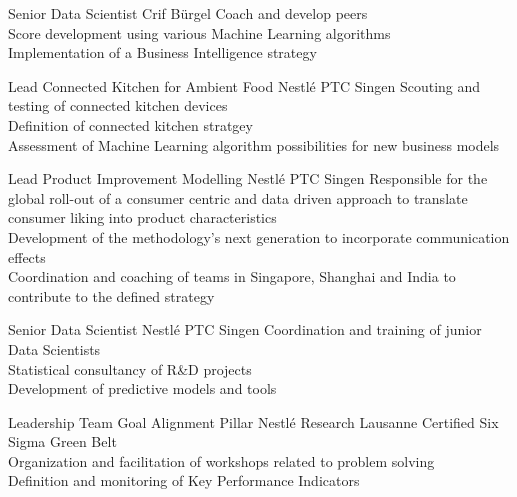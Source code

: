 \documentclass{yalcv}
\begin{document}
\begin{cvbody}


    {Senior Data Scientist}
    {Crif Bürgel}
    {Coach and develop peers\\
        Score development using various Machine Learning algorithms\\
        Implementation of a Business Intelligence strategy}

    {Lead Connected Kitchen for Ambient Food}
    {Nestlé PTC Singen}
    {Scouting and testing of connected kitchen devices\\
        Definition of connected kitchen stratgey\\
        Assessment of Machine Learning algorithm possibilities for new business models}

    {Lead Product Improvement Modelling}
    {Nestlé PTC Singen}
    {Responsible for the global roll-out of a consumer centric and data driven approach to translate
        consumer liking into product characteristics\\
        Development of the methodology’s next generation to incorporate communication effects\\
        Coordination and coaching of teams in Singapore, Shanghai and India to contribute to
        the defined strategy}

    {Senior Data Scientist}
    {Nestlé PTC Singen}
    {Coordination and training of junior Data Scientists\\
        Statistical consultancy of R\&D projects\\
        Development of predictive models and tools}

    {Leadership Team Goal Alignment Pillar}
    {Nestlé Research Lausanne}
    {Certified Six Sigma Green Belt\\
        Organization and facilitation of workshops related to problem solving\\
        Definition and monitoring of Key Performance Indicators}


\end{cvbody}
\end{document}
